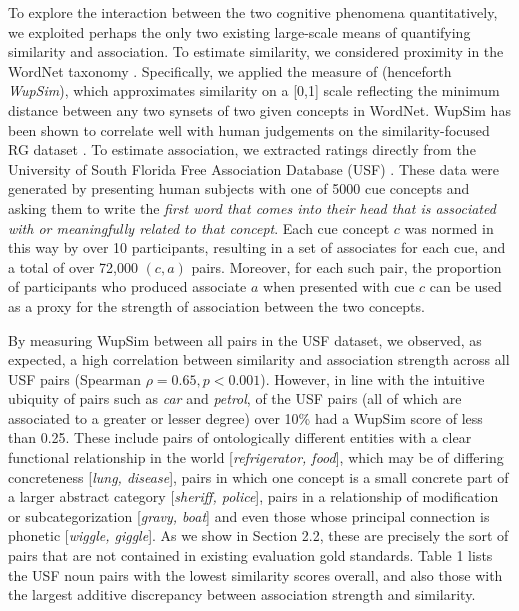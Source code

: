 \documentclass[fullname]{clv2}
\begin{document}
To explore the interaction between the two cognitive phenomena quantitatively, we exploited perhaps the only two existing large-scale means of quantifying similarity and association. To estimate similarity, we considered proximity in the WordNet taxonomy \cite{fellbaum1999wordnet}. Specifically, we applied the measure of  (henceforth \emph{WupSim}), which approximates similarity on a [0,1] scale reflecting the minimum distance between any two synsets of two given concepts in WordNet. WupSim has been shown to correlate well with human judgements on the similarity-focused RG dataset \cite{wu1994verbs}. To estimate association, we extracted ratings directly from the University of South Florida Free Association Database (USF) \cite{nelson2004university}. These data were generated by presenting human subjects with one of 5000 cue concepts and asking them to write the \emph{first word that comes into their head that is associated with or meaningfully related to that concept}. Each cue concept \( c \) was normed in this way by over 10 participants, resulting in a set of associates for each cue, and a total of over 72,000 \((c,a)\) pairs. Moreover, for each such pair, the proportion of participants who produced associate \(a\) when presented with cue \(c\) can be used as a proxy for the strength of association between the two concepts.

By measuring WupSim between all pairs in the USF dataset, we observed, as expected, a high correlation between similarity and association strength across all USF pairs (Spearman \( \rho= 0.65, p<0.001 \)). However, in line with the intuitive ubiquity of pairs such as \emph{car} and \emph{petrol}, of the USF pairs (all of which are associated to a greater or lesser degree) over 10\% had a WupSim score of less than 0.25. These include pairs of ontologically different entities with a clear functional relationship in the world [\emph{refrigerator, food}], which may be of differing concreteness [\emph{lung, disease}], pairs in which one concept is a small concrete part of a larger abstract category [\emph{sheriff, police}], pairs in a relationship of modification or subcategorization [\emph{gravy, boat}] and even those whose principal connection is phonetic [\emph{wiggle, giggle}]. As we show in Section 2.2, these are precisely the sort of pairs that are not contained in existing evaluation gold standards. Table 1 lists the USF noun pairs with the lowest similarity scores overall, and also those with the largest additive discrepancy between association strength and similarity.
\end{document}
